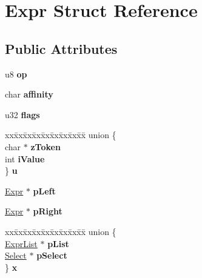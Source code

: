 \hypertarget{struct_expr}{}\section{Expr Struct Reference}
\label{struct_expr}
\subsection*{Public Attributes}
\begin{DoxyCompactItemize}
\item 
\mbox{\label{struct_expr_a101c55ddb6c149d95f0327831eb78225}} 
u8 {\bfseries op}
\item 
\mbox{\label{struct_expr_aeb51b76e606d6fbae234e38473bf3dc9}} 
char {\bfseries affinity}
\item 
\mbox{\label{struct_expr_aebac9ee7e6aa7adca63969d3ba8d0ded}} 
u32 {\bfseries flags}
\item 
\mbox{\label{struct_expr_a052026da2d8109c91b34567afc77c352}} 
\begin{tabbing}
xx\=xx\=xx\=xx\=xx\=xx\=xx\=xx\=xx\=\kill
union \{\\
\>char $\ast$ {\bfseries zToken}\\
\>int {\bfseries iValue}\\
\} {\bfseries u}\\

\end{tabbing}\item 
\mbox{\label{struct_expr_a0a78282ae0d696f4a25013a12e38b1ba}} 
\mbox{\hyperlink{struct_expr}{Expr}} $\ast$ {\bfseries p\+Left}
\item 
\mbox{\label{struct_expr_aa08c218d5b0b6f8882e8bf9ec8822a08}} 
\mbox{\hyperlink{struct_expr}{Expr}} $\ast$ {\bfseries p\+Right}
\item 
\mbox{\label{struct_expr_a951980903f9ae45cbd5d23b679021cad}} 
\begin{tabbing}
xx\=xx\=xx\=xx\=xx\=xx\=xx\=xx\=xx\=\kill
union \{\\
\>\mbox{\hyperlink{struct_expr_list}{ExprList}} $\ast$ {\bfseries pList}\\
\>\mbox{\hyperlink{struct_select}{Select}} $\ast$ {\bfseries pSelect}\\
\} {\bfseries x}\\


\end{tabbing}
\end{DoxyCompactItemize}
